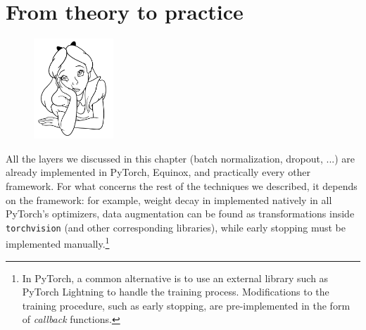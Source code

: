 \section*{From theory to practice}

\begin{figure}
\vspace{-3em}\includegraphics[width=3.0cm]{images/shutterstock_2075221579.jpg}
\vspace{-2em}
\end{figure}

All the layers we discussed in this chapter (batch normalization, dropout, ...) are already implemented in PyTorch, Equinox, and practically every other framework. For what concerns the rest of the techniques we described, it depends on the framework: for example, weight decay in implemented natively in all PyTorch's optimizers, data augmentation can be found as transformations inside \texttt{torchvision} (and other corresponding libraries), while early stopping must be implemented manually.\footnote{In PyTorch, a common alternative is to use an external library such as PyTorch Lightning to handle the training process. Modifications to the training procedure, such as early stopping, are pre-implemented in the form of \textit{callback} functions.}

